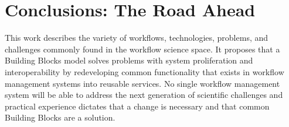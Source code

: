 \section{Conclusions: The Road Ahead}

This work describes the variety of workflows, technologies, problems, and
challenges commonly found in the workflow science space. It proposes that a
Building Blocks model solves problems with system proliferation and
interoperability by redeveloping common functionality that exists in workflow
management systems into reusable services. No single workflow management system
will be able to address the next generation of scientific challenges and
practical experience dictates that a change is necessary and that common
Building Blocks are a solution.

